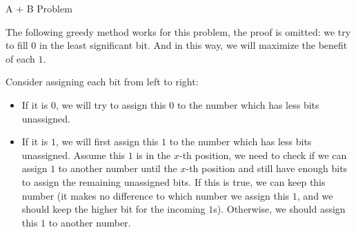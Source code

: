 \begin{tutorial}{A + B Problem}

The following greedy method works for this problem, the proof is omitted: we try to fill $0$ in the least significant bit. And in this way, we will maximize the benefit of each $1$.

Consider assigning each bit from left to right:

\begin{itemize}
\item If it is $0$, we will try to assign this $0$ to the number which has less bits unassigned.
\item If it is $1$, we will first assign this $1$ to the number which has less bits unassigned. Assume this $1$ is in the $x$-th position, we need to check if we can assign $1$ to another number until the $x$-th position and still have enough bits to assign the remaining unassigned bits. If this is true, we can keep this number (it makes no difference to which number we assign this $1$, and we should keep the higher bit for the incoming $1$s). Otherwise, we should assign this $1$ to another number.
\end{itemize}

\end{tutorial}
